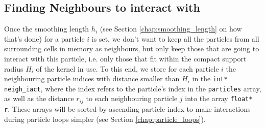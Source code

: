 \subsection{Finding Neighbours to interact with}

Once the smoothing length $h_i$ (see Section \ref{chap:smoothing_length} on how that's done) for a particle $i$ is set, we don't want to keep all the particles from all surrounding cells in memory as neighbours, but only keep those that are going to interact with this particle, i.e. only those that fit within the compact support radius $H_i$ of the kernel in use.
To this end, we store for each particle $i$ the neighbouring particle indices with distance smaller than $H_i$ in the \verb|int* neigh_iact|, where the index refers to the particle's index in the \texttt{particles} array, as well as the distance $r_{ij}$ to each neighbouring particle $j$ into the array \verb|float* r|. 
These arrays will be sorted by ascending particle index to make interactions during particle loops simpler (see Section \ref{chap:particle_loops}).


